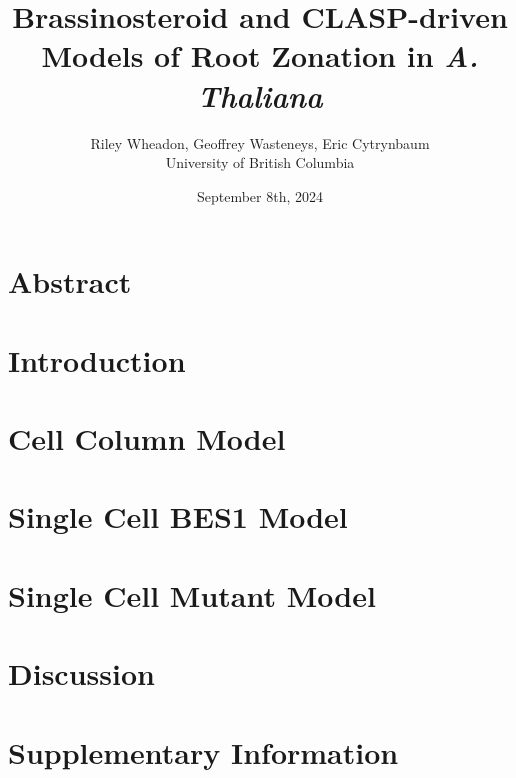 \documentclass[11pt, oneside]{article}
\begin{document}
\title{Brassinosteroid and CLASP-driven Models of Root Zonation in \emph{A. Thaliana}}
\author{Riley Wheadon, Geoffrey Wasteneys, Eric Cytrynbaum \\ University of British Columbia}
\date{September 8th, 2024}
\maketitle

\section{Abstract}



\newpage

\section{Introduction}



\newpage

\section{Cell Column Model}



\newpage

\section{Single Cell BES1 Model}





\newpage

\section{Single Cell Mutant Model}

%
% 
% 

\newpage

\section{Discussion}



\appendix
\section{Supplementary Information}





\newpage
\printbibliography
\end{document}
